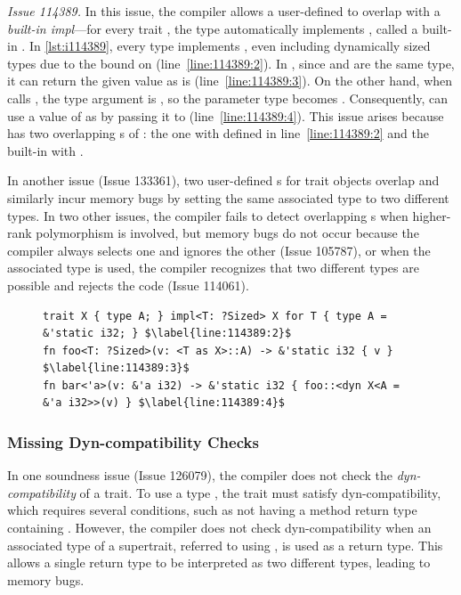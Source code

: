 {\it Issue 114389.}
%
In this issue, the compiler allows a user-defined  to overlap with a
\emph{built-in impl}---for every trait , the type  automatically
implements , called a built-in .
%
In \cref{lst:i114389}, every type implements , even including dynamically
sized types due to the bound  on  (line~\ref{line:114389:2}).
%
In , since  and  are the same type, it
can return the given value as is (line~\ref{line:114389:3}).
%
On the other hand, when  calls , the type argument is , so the parameter type  becomes .
%
Consequently,  can use a value of  as  by
passing it to  (line~\ref{line:114389:4}).
%
This issue arises because  has two overlapping s
of :
%
the one with  defined in line~\ref{line:114389:2} and the
built-in  with .

In another issue (Issue 133361), two user-defined s for trait objects
overlap and similarly incur memory bugs by setting the same associated type to
two different types.
%
In two other issues, the compiler fails to detect overlapping s when
higher-rank polymorphism is involved, but memory bugs do not occur
%
because the compiler always selects one  and ignores the other (Issue
105787),
%
or when the associated type is used, the compiler recognizes that two different
types are possible and rejects the code (Issue 114061).

\begin{figure}[t]
\begin{lstlisting}[caption={Issue 114389}, label={lst:i114389}]
trait X { type A; } impl<T: ?Sized> X for T { type A = &'static i32; } $\label{line:114389:2}$
fn foo<T: ?Sized>(v: <T as X>::A) -> &'static i32 { v } $\label{line:114389:3}$
fn bar<'a>(v: &'a i32) -> &'static i32 { foo::<dyn X<A = &'a i32>>(v) } $\label{line:114389:4}$
\end{lstlisting}
\vspace{-2em}
\end{figure}

\subsubsection{Missing Dyn-compatibility Checks}

In one soundness issue (Issue 126079), the compiler does not check the
\emph{dyn-compatibility} of a trait.
%
To use a type , the trait  must satisfy dyn-compatibility, which
requires several conditions, such as not having a method return type containing
.
%
However, the compiler does not check dyn-compatibility when an associated type
of a supertrait, referred to using , is used as a return type.
%
This allows a single return type to be interpreted as two different types,
leading to memory bugs.

